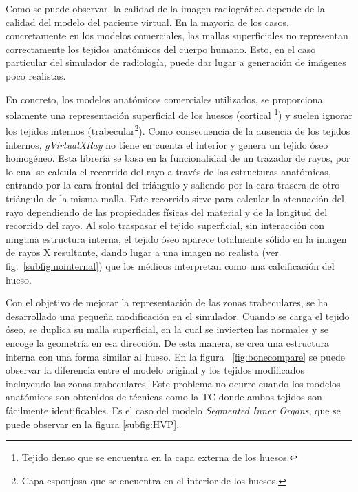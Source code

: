 Como se puede observar, la calidad de la imagen radiográfica depende de la calidad del modelo del paciente virtual. %
En la mayoría de los casos, concretamente en los modelos comerciales, las mallas superficiales no representan correctamente los tejidos anatómicos del cuerpo humano. Esto, en el caso particular del simulador de radiología,  puede dar lugar a generación de imágenes poco realistas. 

En concreto, los modelos anatómicos comerciales utilizados, se proporciona solamente una representación  superficial de los huesos (cortical \footnote{Tejido denso que se encuentra en la capa externa de los huesos.}) y suelen ignorar los tejidos internos (trabecular\footnote{Capa esponjosa que se encuentra en el interior de los huesos.}). Como consecuencia de la ausencia de los tejidos internos, \emph{gVirtualXRay} no tiene en cuenta el interior y genera un tejido óseo homogéneo. 
Esta librería se basa en la funcionalidad de un trazador de rayos, por lo cual se calcula el recorrido del rayo a través de las estructuras anatómicas, entrando por la cara frontal del triángulo y saliendo por la cara trasera de otro triángulo de la misma malla. Este recorrido sirve para calcular la atenuación del rayo dependiendo de las propiedades físicas del material y de la longitud del recorrido del rayo. Al solo traspasar el tejido superficial, sin interacción con ninguna estructura interna, el tejido óseo aparece totalmente sólido en la imagen de rayos X resultante, dando lugar a una imagen no realista (ver fig.~\ref{subfig:nointernal}) que los médicos interpretan como una calcificación del hueso.

Con el objetivo de mejorar la representación de las zonas trabeculares, se ha desarrollado una pequeña modificación en el simulador. Cuando se carga el tejido óseo, se duplica su malla superficial, en la cual se invierten las normales y se encoge la geometría en esa dirección. De esta manera, se crea una estructura interna con una forma similar al hueso. En la figura ~\ref{fig:bonecompare} se puede observar la diferencia entre el modelo original y los tejidos modificados incluyendo las zonas trabeculares. Este problema no ocurre cuando los modelos anatómicos son obtenidos de técnicas como la \ac{TC} donde ambos tejidos son fácilmente identificables. Es el caso del modelo \emph{Segmented Inner Organs}\cite{VoxelMan}, que se puede observar en la figura \ref{subfig:HVP}.




